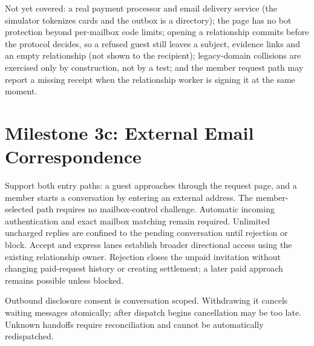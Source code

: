 \documentclass[11pt]{article}
\begin{document}
Not yet covered: a real payment processor and email delivery service (the simulator
tokenizes cards and the outbox is a directory); the page has no bot protection
beyond per-mailbox code limits; opening a relationship commits before the protocol
decides, so a refused guest still leaves a subject, evidence links and an empty
relationship (not shown to the recipient); legacy-domain collisions are exercised
only by construction, not by a test; and the member request path may report a
missing receipt when the relationship worker is signing it at the same moment.

\section{Milestone 3c: External Email Correspondence}

Support both entry paths: a guest approaches through the request page, and a
member starts a conversation by entering an external address. The member-selected
path requires no mailbox-control challenge. Automatic incoming authentication and
exact mailbox matching remain required. Unlimited uncharged replies are confined
to the pending conversation until rejection or block. Accept and express lanes
establish broader directional access using the existing relationship owner.
Rejection closes the unpaid invitation without changing paid-request history or
creating settlement; a later paid approach remains possible unless blocked.

Outbound disclosure consent is conversation scoped. Withdrawing it cancels waiting
messages atomically; after dispatch begins cancellation may be too late. Unknown
handoffs require reconciliation and cannot be automatically redispatched.
\end{document}
